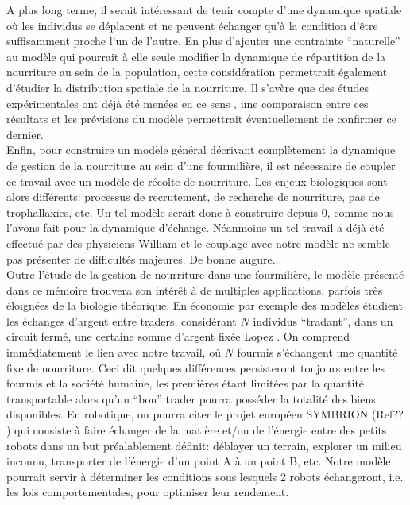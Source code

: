 A plus long terme, il serait intéressant de tenir compte d'une dynamique spatiale où les individus se déplacent et ne peuvent échanger qu'à la condition d'être suffisamment proche l'un de l'autre. En plus d'ajouter une contrainte ``naturelle'' au modèle qui pourrait à elle seule modifier la dynamique de répartition de la nourriture au sein de la population, cette considération permettrait également d'étudier la distribution spatiale de la nourriture. Il s'avère que des études expérimentales ont déjà été menées en ce sens \citep{buffin_feeding_2009}, une comparaison entre ces résultats et les prévisions du modèle permettrait éventuellement de confirmer ce dernier.\\

Enfin, pour construire un modèle général décrivant complètement la dynamique de gestion de la nourriture au sein d'une fourmilière, il est nécessaire de coupler ce travail avec un modèle de récolte de nourriture. Les enjeux biologiques sont alors différents: processus de recrutement, de recherche de nourriture, pas de trophallaxies, etc. Un tel modèle serait donc à construire depuis 0, comme nous l'avons fait pour la dynamique d'échange. Néanmoins un tel travail a déjà été effectué par des physiciens \citep{} William \fixme et le couplage avec notre modèle ne semble pas présenter de difficultés majeures. De bonne augure...\\


Outre l'étude de la gestion de nourriture dans une fourmilière, le modèle présenté dans ce mémoire trouvera son intérêt à de multiples applications, parfois très éloignées de la biologie théorique. En économie par exemple des modèles étudient les échanges d'argent entre traders, considérant $N$ individus ``tradant'', dans un circuit fermé, une certaine somme d'argent fixée \citep{} Lopez \fixme. On comprend immédiatement le lien avec notre travail, où $N$ fourmis s'échangent une quantité fixe de nourriture. Ceci dit quelques différences persisteront toujours entre les fourmis et la société humaine, les premières étant limitées par la quantité transportable alors qu'un ``bon'' trader pourra posséder la totalité des biens disponibles. En robotique, on pourra citer le projet européen SYMBRION (Ref?? \fixme) qui consiste à faire échanger de la matière et/ou de l'énergie entre des petits robots dans un but préalablement définit: déblayer un terrain, explorer un milieu inconnu, transporter de l'énergie d'un point A à un point B, etc. Notre modèle pourrait servir à déterminer les conditions sous lesquels 2 robots échangeront, i.e. les lois comportementales, pour optimiser leur rendement.
